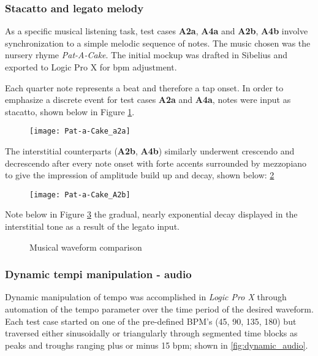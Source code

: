 \subsubsection{Stacatto and legato melody}
As a specific musical listening task, test cases \textbf{A2a}, \textbf{A4a} and \textbf{A2b}, \textbf{A4b} involve synchronization to a simple melodic sequence of notes. The music chosen was the nursery rhyme \textit{Pat-A-Cake}. The initial mockup was drafted in Sibelius and exported to Logic Pro X for bpm adjustment.

Each quarter note represents a beat and therefore a tap onset. In order to emphasize a discrete event for test cases \textbf{A2a} and \textbf{A4a}, notes were input as stacatto, shown below in Figure \ref{fig:patacakea2a}.

\begin{figure}[H]
    \centering
    \texttt{[image: Pat-a-Cake\_a2a]}
    \label{fig:patacakea2a}
\end{figure}

The interstitial counterparts (\textbf{A2b}, \textbf{A4b}) similarly underwent crescendo and decrescendo after every note onset with forte accents surrounded by mezzopiano to give the impression of amplitude build up and decay, shown below: \ref{fig:pat-a-cake_a2b} 

\begin{figure}[H]
    \centering
    \texttt{[image: Pat-a-Cake\_A2b]}
    \label{fig:pat-a-cake_a2b}
\end{figure}

Note below in Figure \ref{fig:music_comparison} the gradual, nearly exponential decay displayed in the interstitial tone as a result of the legato input.

\begin{figure}[H]
    \centering
    \caption{Musical waveform comparison}
        \qquad
    \label{fig:music_comparison}
\end{figure}

\subsubsection{Dynamic tempi manipulation - audio}
Dynamic manipulation of tempo was accomplished in \textit{Logic Pro X} through automation of the tempo parameter over the time period of the desired waveform. Each test case started on one of the pre-defined BPM's (45, 90, 135, 180) but traversed either sinusoidally or triangularly through segmented time blocks as peaks and troughs ranging plus or minus 15 bpm; shown in \ref{fig:dynamic_audio}.

